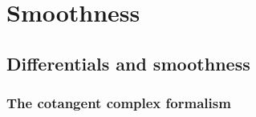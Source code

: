 \chapter{Smoothness} \label{chapter: smoothness}
    \begin{abstract}
        
    \end{abstract}
    
    \minitoc
    
    \section{Differentials and smoothness}
        \subsection{The cotangent complex formalism}
